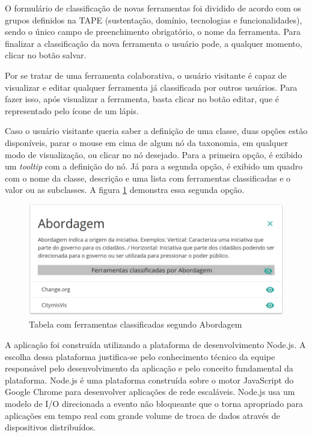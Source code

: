 \par
O formulário de classificação de novas ferramentas foi dividido de acordo com os grupos definidos na TAPE (sustentação, domínio, tecnologias e funcionalidades), sendo o único campo de preenchimento obrigatório, o nome da ferramenta. Para finalizar a classificação da nova ferramenta o usuário pode, a qualquer momento, clicar no botão salvar. 
\par
Por se tratar de uma ferramenta colaborativa, o usuário visitante é capaz de visualizar e editar qualquer ferramenta já classificada por outros usuários. 
Para fazer isso, após visualizar a ferramenta, basta clicar no botão editar, que é representado pelo ícone de um lápis. 

\par
Caso o usuário visitante queria saber a definição de uma classe, duas opções estão disponíveis, parar o mouse em cima de algum nó da taxonomia, em qualquer modo de visualização, 
ou clicar no nó desejado. Para a primeira opção, é exibido um \textit{tooltip} com a definição do nó. Já para a segunda opção, é exibido um quadro com o nome da classe, descrição e 
uma lista com ferramentas classificadas e o valor ou as subclasses. A figura \ref{fig:tabela-ferramentas} demonstra essa segunda opção. 

\begin{figure}[!ht]
    \centering
    \includegraphics[scale=0.20]{./figuras/abordagem.png}
    \caption{Tabela com ferramentas classificadas segundo Abordagem}
    \label{fig:tabela-ferramentas}
\end{figure}
\par


A aplicação foi construída utilizando a plataforma de desenvolvimento Node.js. A escolha dessa plataforma justifica-se pelo conhecimento técnico da equipe
responsável pelo desenvolvimento da aplicação e pelo conceito fundamental da plataforma. Node.js é uma plataforma construída sobre o motor JavaScript do 
Google Chrome para desenvolver aplicações de rede escaláveis. Node.js usa um modelo de I/O direcionada a evento não bloqueante que o torna
apropriado para aplicações em tempo real com grande volume de troca de dados através de dispositivos distribuídos. 
\cite{nodejs}

